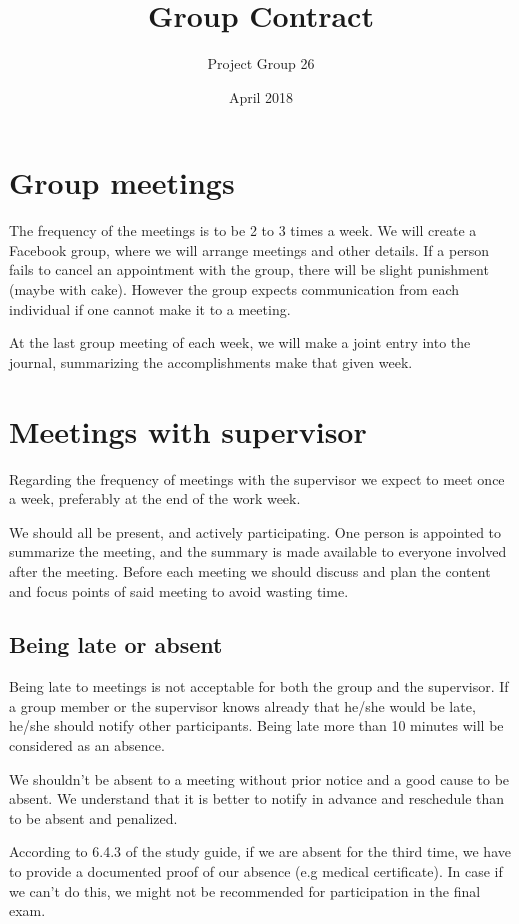 \documentclass[11pt]{article}
\title{Group Contract}
\author{Project Group 26}
\date{April 2018}
\begin{document}
\maketitle

\section{Group meetings}

The frequency of the meetings is to be 2 to 3 times a week. We will create a Facebook group, where we will arrange meetings and other details. If a person fails to cancel an appointment with the group, there will be slight punishment (maybe with cake). However the group expects communication from each individual if one cannot make it to a meeting.

At the last group meeting of each week, we will make a joint entry into the journal, summarizing the accomplishments make that given week.

\section{Meetings with supervisor}

Regarding the frequency of meetings with the supervisor we expect to meet once a week, preferably at the end of the work week.

We should all be present, and actively participating. One person is appointed to summarize the meeting, and the summary is made available to everyone involved after the meeting. Before each meeting we should discuss and plan the content and focus points of said meeting to avoid wasting time. 

\subsection{Being late or absent}
Being late to meetings is not acceptable for both the group and the supervisor. If a group member or the supervisor knows already that he/she would be late, he/she should notify other participants. Being late more than 10 minutes will be considered as an absence.

We shouldn't be absent to a meeting without prior notice and a good cause to be absent. We understand that it is better to notify in advance and reschedule than to be absent and penalized. 

According to 6.4.3 of the study guide, if we are absent for the third time, we have to provide a documented proof of our absence (e.g medical certificate). In case if we can't do this, we might not be recommended for participation in the final exam. 
\end{document}
